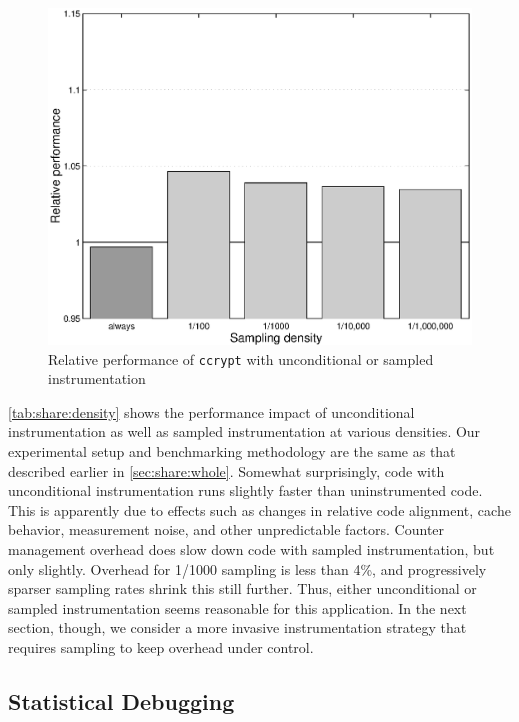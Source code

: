 \begin{figure}
  \centering
  \small
  \includegraphics[width=\columnwidth]{applications/ccrypt_density}
  \caption{Relative performance of \texttt{ccrypt} with unconditional or
    sampled instrumentation}
  \label{fig:ccrypt:slowdown}
\end{figure}

\autoref{tab:share:density} shows the performance impact of
unconditional instrumentation as well as sampled instrumentation at
various densities.  Our experimental setup and benchmarking
methodology are the same as that described earlier in
\autoref{sec:share:whole}.  Somewhat surprisingly, code with
unconditional instrumentation runs slightly faster than uninstrumented
code.  This is apparently due to effects such as changes in relative
code alignment, cache behavior, measurement noise, and other
unpredictable factors.  Counter management overhead does slow down
code with sampled instrumentation, but only slightly.  Overhead for
1/1000 sampling is less than 4\%, and progressively sparser sampling
rates shrink this still further.  Thus, either unconditional or
sampled instrumentation seems reasonable for this application.  In the
next section, though, we consider a more invasive instrumentation
strategy that requires sampling to keep overhead under control.

\subsection{Statistical Debugging}
\label{sec:bc}

